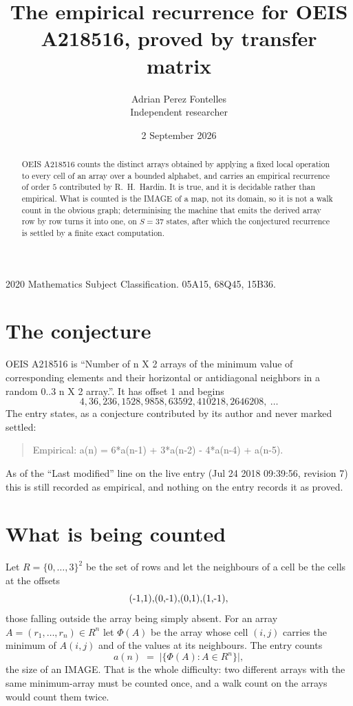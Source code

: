 \documentclass[11pt,a4paper]{article}
\title{The empirical recurrence for OEIS A218516, proved by transfer matrix}
\author{Adrian Perez Fontelles\\ \small Independent researcher}
\date{2 September 2026}
\theoremstyle{plain}
\theoremstyle{definition}
\begin{document}
\maketitle

\begin{abstract}
OEIS A218516 counts the distinct arrays obtained by applying a fixed local operation to every cell
of an array over a bounded alphabet, and carries an empirical recurrence of order $5$
contributed by R.~H.~Hardin. It is true, and it is decidable rather than empirical. What is
counted is the IMAGE of a map, not its domain, so it is not a walk count in the obvious graph;
determinising the machine that emits the derived array row by row turns it into one, on
$S=37$ states, after which the conjectured recurrence is settled by a finite exact
computation.
\end{abstract}

\noindent\small 2020 Mathematics Subject Classification. 05A15, 68Q45, 15B36.\normalsize

\section{The conjecture}

OEIS A218516 is ``Number of n X 2 arrays of the minimum value of corresponding elements and their horizontal or antidiagonal neighbors in a random 0..3 n X 2 array.''. It has offset $1$ and begins
\[
4, 36, 236, 1528, 9858, 63592, 410218, 2646208,\ \dots
\]
The entry states, as a conjecture contributed by its author and never marked settled:
\begin{quote}
Empirical: a(n) = 6*a(n-1) + 3*a(n-2) - 4*a(n-4) + a(n-5).
\end{quote}
As of the ``Last modified'' line on the live entry (Jul 24 2018 09:39:56, revision 7) this is still
recorded as empirical, and nothing on the entry records it as proved.

\section{What is being counted}

Let $R=\{0,\dots,3\}^{2}$ be the set of rows and let the neighbours of
a cell be the cells at the offsets
\[
$(-1,1)$, $(0,-1)$, $(0,1)$, $(1,-1)$,
\]
those falling outside the array being simply absent. For an array
$A=(r_1,\dots,r_n)\in R^n$ let $\Phi(A)$ be the array whose cell $(i,j)$ carries the
minimum of $A(i,j)$ and of the values at its neighbours. The entry counts
\[
a(n)\;=\;\bigl|\{\Phi(A):A\in R^n\}\bigr| ,
\]
the size of an IMAGE. That is the whole difficulty: two different arrays with the same
minimum-array must be counted once, and a walk count on the arrays would count them twice.
\end{document}
